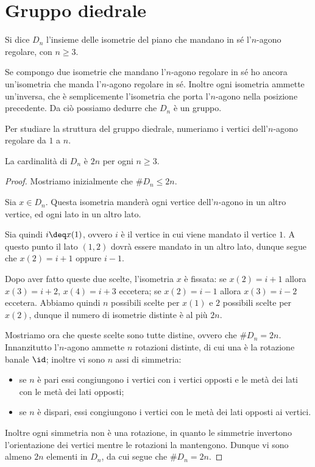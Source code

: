 \section{Gruppo diedrale}

\begin{definition}
    Si dice $D_n$ l'insieme delle isometrie del piano che mandano in sé l'$n$-agono regolare, con $n \geq 3$.
\end{definition}

\begin{remark}
    Se compongo due isometrie che mandano l'$n$-agono regolare in sé ho ancora un'isometria che manda l'$n$-agono regolare in sé. 
    Inoltre ogni isometria ammette un'inversa, che è semplicemente l'isometria che porta l'$n$-agono nella posizione precedente. 
    Da ciò possiamo dedurre che $D_n$ è un gruppo.
\end{remark}

Per studiare la struttura del gruppo diedrale, numeriamo i vertici dell'$n$-agono regolare da $1$ a $n$.

\begin{proposition}
     La cardinalità di $D_n$ è $2n$ per ogni $n \geq 3$.
\end{proposition}
\begin{proof}
    Mostriamo inizialmente che $\#D_n \leq 2n$.

    Sia $x \in D_n$. Questa isometria manderà ogni vertice dell'$n$-agono in un altro vertice, ed ogni lato in un altro lato. 
    
    Sia quindi $i \deq x(1)$, ovvero $i$ è il vertice in cui viene mandato il vertice $1$. A questo punto il lato $(1, 2)$ dovrà essere mandato in un altro lato, dunque segue che $x(2) = i+1$ oppure $i-1$. 
    
    Dopo aver fatto queste due scelte, l'isometria $x$ è fissata: se $x(2) = i+1$ allora $x(3) = i+2$, $x(4) = i+3$ eccetera; se $x(2) = i-1$ allora $x(3)=i-2$ eccetera. Abbiamo quindi $n$ possibili scelte per $x(1)$ e $2$ possibili scelte per $x(2)$, dunque il numero di isometrie distinte è al più $2n$. 

    Mostriamo ora che queste scelte sono tutte distine, ovvero che $\#D_n = 2n$. Innanzitutto l'$n$-agono ammette $n$ rotazioni distinte, di cui una è la rotazione banale $\id$; inoltre vi sono $n$ assi di simmetria:
    \begin{itemize}
        \item se $n$ è pari essi congiungono i vertici con i vertici opposti e le metà dei lati con le metà dei lati opposti;
        \item se $n$ è dispari, essi congiungono i vertici con le metà dei lati opposti ai vertici.
    \end{itemize}
    Inoltre ogni simmetria non è una rotazione, in quanto le simmetrie invertono l'orientazione dei vertici mentre le rotazioni la mantengono. Dunque vi sono almeno $2n$ elementi in $D_n$, da cui segue che $\#D_n = 2n$.
\end{proof}

